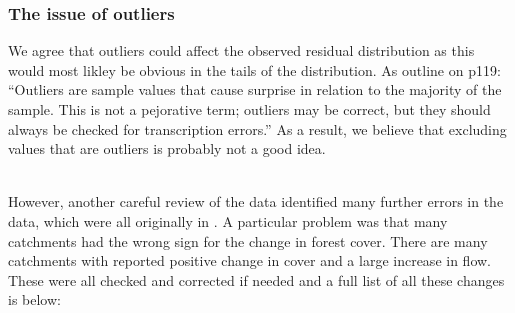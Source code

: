 \documentclass[]{elsarticle} %
\begin{document}
\hypertarget{the-issue-of-outliers}{%
\subsubsection{The issue of outliers}\label{the-issue-of-outliers}}

We agree that outliers could affect the observed residual distribution as this would most likley be obvious in the tails of the distribution. As \citet{venables2013modern} outline on p119:
``Outliers are sample values that cause surprise in relation to the majority of the sample. This is not a pejorative term; outliers may be correct, but they should always be checked for transcription errors.'' As a result, we believe that excluding values that are outliers is probably not a good idea.\\
\strut \\
However, another careful review of the data identified many further errors in the data, which were all originally in \citet{zhang2017}. A particular problem was that many catchments had the wrong sign for the change in forest cover. There are many catchments with reported positive change in cover and a large increase in flow. These were all checked and corrected if needed and a full list of all these changes is below:
\end{document}
